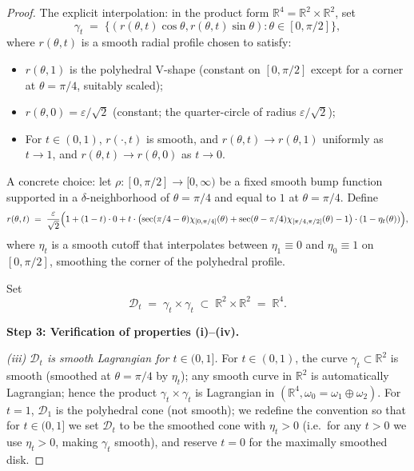 \documentclass[12pt]{article}
\theoremstyle{definition}
\begin{document}
\begin{proof}
The explicit interpolation: in the product form $\mathbb{R}^4=\mathbb{R}^2\times\mathbb{R}^2$, set
\begin{equation}\label{eq:gamma-t}
\gamma_t \;=\; \bigl\{(r(\theta,t)\cos\theta,r(\theta,t)\sin\theta):\theta\in[0,\pi/2]\bigr\},
\end{equation}
where $r(\theta,t)$ is a smooth radial profile chosen to satisfy:
\begin{itemize}
\item $r(\theta,1)$ is the polyhedral V-shape (constant on $[0,\pi/2]$ except for a corner at $\theta=\pi/4$, suitably scaled);
\item $r(\theta,0) = \varepsilon/\sqrt{2}$ (constant; the quarter-circle of radius $\varepsilon/\sqrt{2}$);
\item For $t\in(0,1)$, $r(\cdot,t)$ is smooth, and $r(\theta,t)\to r(\theta,1)$ uniformly as $t\to 1$, and $r(\theta,t)\to r(\theta,0)$ as $t\to 0$.
\end{itemize}

A concrete choice: let $\rho:[0,\pi/2]\to[0,\infty)$ be a fixed smooth bump function supported in a $\delta$-neighborhood of $\theta=\pi/4$ and equal to $1$ at $\theta=\pi/4$. Define
\begin{equation}\label{eq:r-explicit}
r(\theta,t) \;=\; \frac{\varepsilon}{\sqrt{2}}\Bigl(1+(1-t)\cdot 0 + t\cdot\bigl(\sec(\pi/4-\theta)\chi_{[0,\pi/4]}(\theta)+\sec(\theta-\pi/4)\chi_{[\pi/4,\pi/2]}(\theta)-1\bigr)\cdot(1-\eta_t(\theta))\Bigr),
\end{equation}
where $\eta_t$ is a smooth cutoff that interpolates between $\eta_1\equiv 0$ and $\eta_0\equiv 1$ on $[0,\pi/2]$, smoothing the corner of the polyhedral profile.

Set
\begin{equation}\label{eq:Dt-explicit}
\mathcal{D}_t \;=\; \gamma_t\times\gamma_t \;\subset\;\mathbb{R}^2\times\mathbb{R}^2 \;=\;\mathbb{R}^4.
\end{equation}

\smallskip\noindent\textbf{Step 3: Verification of properties (i)--(iv).}

\emph{(iii) $\mathcal{D}_t$ is smooth Lagrangian for $t\in(0,1]$.} For $t\in(0,1)$, the curve $\gamma_t\subset\mathbb{R}^2$ is smooth (smoothed at $\theta=\pi/4$ by $\eta_t$); any smooth curve in $\mathbb{R}^2$ is automatically Lagrangian; hence the product $\gamma_t\times\gamma_t$ is Lagrangian in $(\mathbb{R}^4,\omega_0=\omega_1\oplus\omega_2)$. For $t=1$, $\mathcal{D}_1$ is the polyhedral cone (not smooth); we redefine the convention so that for $t\in(0,1]$ we set $\mathcal{D}_t$ to be the smoothed cone with $\eta_t>0$ (i.e.\ for any $t>0$ we use $\eta_t>0$, making $\gamma_t$ smooth), and reserve $t=0$ for the maximally smoothed disk.


\end{proof}
\end{document}
